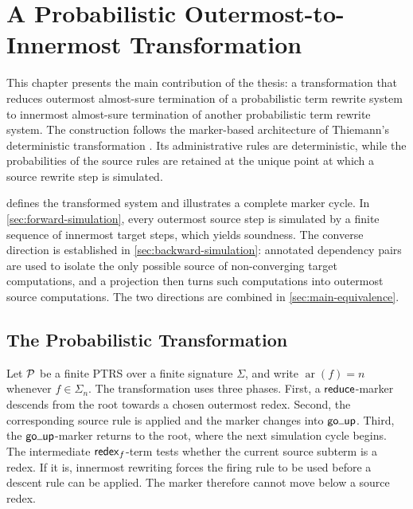 \chapter{A Probabilistic Outermost-to-Innermost Transformation}
\label{chap:main-chapter}

This chapter presents the main contribution of the thesis: a transformation
that reduces outermost almost-sure termination of a probabilistic term rewrite
system to innermost almost-sure termination of another probabilistic term
rewrite system.  The construction follows the marker-based architecture of
Thiemann's deterministic transformation \cite{thiemann_2009_outermost}.  Its
administrative rules are deterministic, while the probabilities of the source
rules are retained at the unique point at which a source rewrite step is
simulated.

 defines the transformed system and
illustrates a complete marker cycle.  In
\cref{sec:forward-simulation}, every outermost source step is simulated by a
finite sequence of innermost target steps, which yields soundness.  The converse
direction is established in \cref{sec:backward-simulation}: annotated dependency
pairs are used to isolate the only possible source of non-converging target
computations, and a projection then turns such computations into outermost
source computations.  The two directions are combined in
\cref{sec:main-equivalence}.

\section{The Probabilistic Transformation}
\label{sec:probabilistic-transformation}

Let \(\P\) be a finite PTRS over a finite signature \(\Sigma\), and write
\(\operatorname{ar}(f)=n\) whenever \(f\in\Sigma_n\).  The
transformation uses three phases.  First, a \(\treduce\)-marker descends from
the root towards a chosen outermost redex.  Second, the corresponding source
rule is applied and the marker changes into \(\tgoup\).  Third, the
\(\tgoup\)-marker returns to the root, where the next simulation cycle begins.
The intermediate \(\tredex_f\)-term tests whether the current source subterm is
a redex.  If it is, innermost rewriting forces the firing rule to be used before
a descent rule can be applied.  The marker therefore cannot move below a source
redex.

